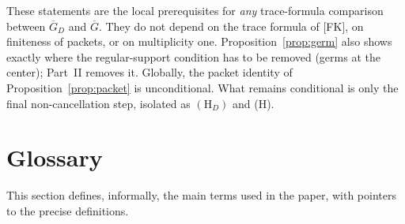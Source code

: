 \documentclass[12pt]{article}
\newcommand{\ov}[1]{\overline{#1}}
\newcommand{\Gb}{\ov{G}}
\newcommand{\GDb}{\ov{G}_D}
\theoremstyle{plain}
\theoremstyle{definition}
\begin{document}
These statements are the local prerequisites for \emph{any} trace-formula comparison between $\GDb$ and $\Gb$. They do not depend on the trace formula of [FK], on finiteness of packets, or on multiplicity one. Proposition~\ref{prop:germ} also shows exactly where the regular-support condition has to be removed (germs at the center); Part~II removes it. Globally, the packet identity of Proposition~\ref{prop:packet} is unconditional. What remains conditional is only the final non-cancellation step, isolated as $(\mathrm H_D)$ and (H).

\section{Glossary}\label{sec:glossary}
This section defines, informally, the main terms used in the paper, with pointers to the precise definitions.
\end{document}
